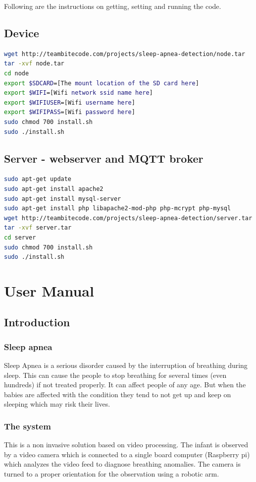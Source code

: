 \documentclass{report}
\begin{document}
Following are the instructions on getting, setting and running the code.\\


\section{Device}
\begin{lstlisting}[language=bash]
wget http://teambitecode.com/projects/sleep-apnea-detection/node.tar
tar -xvf node.tar
cd node
export $SDCARD=[The mount location of the SD card here]
export $WIFI=[Wifi network ssid name here]
export $WIFIUSER=[Wifi username here]
export $WIFIPASS=[Wifi password here]
sudo chmod 700 install.sh
sudo ./install.sh
\end{lstlisting}

\section{Server - webserver and MQTT broker}
\begin{lstlisting}[language=bash]
sudo apt-get update
sudo apt-get install apache2
sudo apt-get install mysql-server
sudo apt-get install php libapache2-mod-php php-mcrypt php-mysql
wget http://teambitecode.com/projects/sleep-apnea-detection/server.tar
tar -xvf server.tar
cd server
sudo chmod 700 install.sh
sudo ./install.sh
\end{lstlisting}

\chapter{User Manual}

\section{Introduction}
\subsection{Sleep apnea}
Sleep Apnea is a serious disorder caused by the interruption of breathing during sleep. This can cause the people to stop breathing for several times (even hundreds) if not treated properly. It can affect people of any age. But when the babies are affected with the condition they tend to not get up and keep on sleeping which may risk their lives.

\subsection{The system}
This is a non invasive solution based on video processing. The infant is observed by a video camera which is connected to a single board computer (Raspberry pi) which analyzes the video feed to diagnose breathing anomalies. The camera is turned to a proper orientation for the observation using a robotic arm.
\end{document}
